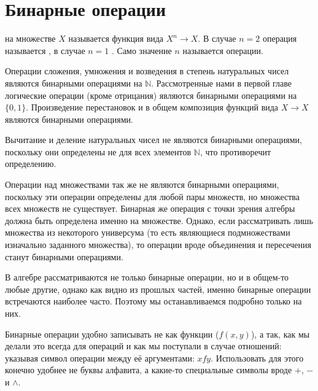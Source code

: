\section{Бинарные операции}

\begin{definition}
	 на множестве $X$ называется функция вида $X^n \to X$. В случае $n=2$ операция называется , в случае $n=1$ . Само значение $n$ называется  операции.
\end{definition}

\begin{example}
Операции сложения, умножения и возведения в степень натуральных чисел являются бинарными операциями на $\mathbb{N}$. Рассмотренные нами в первой главе логические операции (кроме отрицания) являются бинарными операциями на $\{0,1\}$. Произведение перестановок и в общем композиция функций вида $X\to X$ являются бинарными операциями.
\end{example}

\begin{example}
Вычитание и деление натуральных чисел не являются бинарными операциями, поскольку они определены не для всех элементов $\mathbb{N}$, что противоречит определению.
\end{example}

\begin{example}
Операции над множествами так же не являются бинарными операциями, поскольку эти операции определены для любой пары множеств, но множества всех множеств не существует. Бинарная же операция с точки зрения алгебры должна быть определена именно на множестве. Однако, если рассматривать лишь множества из некоторого универсума (то есть являющиеся подмножествами изначально заданного множества), то операции вроде объединения и пересечения станут бинарными операциями.
\end{example}

В алгебре рассматриваются не только бинарные операции, но и в общем-то любые другие, однако как видно из прошлых частей, именно бинарные операции встречаются наиболее часто. Поэтому мы останавливаемся подробно только на них.

Бинарные операции удобно записывать не как функции ($f(x, y)$), а так, как мы делали это всегда для операций и как мы поступали в случае отношений: указывая символ операции между её аргументами: $xfy$. Использовать для этого конечно удобнее не буквы алфавита, а какие-то специальные символы вроде $+$, $-$ и $\land$.


